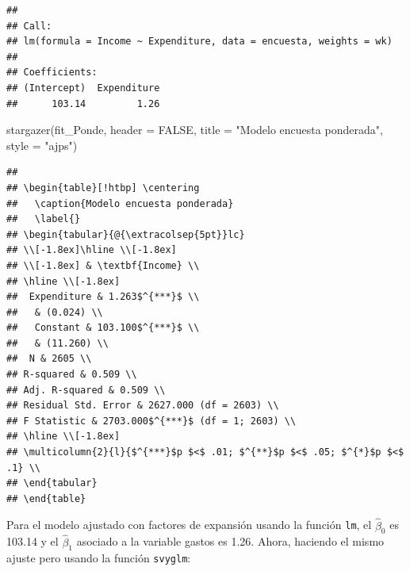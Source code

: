 \documentclass[
  12pt,
]{book}
\newenvironment{Shaded}{\begin{snugshade}}{\end{snugshade}}
\newcommand{\AttributeTok}[1]{\textcolor[rgb]{0.77,0.63,0.00}{#1}}
\newcommand{\ConstantTok}[1]{\textcolor[rgb]{0.00,0.00,0.00}{#1}}
\newcommand{\FunctionTok}[1]{\textcolor[rgb]{0.00,0.00,0.00}{#1}}
\newcommand{\NormalTok}[1]{#1}
\newcommand{\StringTok}[1]{\textcolor[rgb]{0.31,0.60,0.02}{#1}}
\begin{document}
\begin{verbatim}
## 
## Call:
## lm(formula = Income ~ Expenditure, data = encuesta, weights = wk)
## 
## Coefficients:
## (Intercept)  Expenditure  
##      103.14         1.26
\end{verbatim}

\begin{Shaded}
\begin{Highlighting}[]
\FunctionTok{stargazer}\NormalTok{(fit\_Ponde, }\AttributeTok{header =} \ConstantTok{FALSE}\NormalTok{,}
          \AttributeTok{title =} \StringTok{"Modelo encuesta ponderada"}\NormalTok{, }
          \AttributeTok{style =} \StringTok{"ajps"}\NormalTok{)}
\end{Highlighting}
\end{Shaded}

\begin{verbatim}
## 
## \begin{table}[!htbp] \centering 
##   \caption{Modelo encuesta ponderada} 
##   \label{} 
## \begin{tabular}{@{\extracolsep{5pt}}lc} 
## \\[-1.8ex]\hline \\[-1.8ex] 
## \\[-1.8ex] & \textbf{Income} \\ 
## \hline \\[-1.8ex] 
##  Expenditure & 1.263$^{***}$ \\ 
##   & (0.024) \\ 
##   Constant & 103.100$^{***}$ \\ 
##   & (11.260) \\ 
##  N & 2605 \\ 
## R-squared & 0.509 \\ 
## Adj. R-squared & 0.509 \\ 
## Residual Std. Error & 2627.000 (df = 2603) \\ 
## F Statistic & 2703.000$^{***}$ (df = 1; 2603) \\ 
## \hline \\[-1.8ex] 
## \multicolumn{2}{l}{$^{***}$p $<$ .01; $^{**}$p $<$ .05; $^{*}$p $<$ .1} \\ 
## \end{tabular} 
## \end{table}
\end{verbatim}

Para el modelo ajustado con factores de expansión usando la función \texttt{lm}, el \(\hat{\beta}_{0}\) es 103.14 y el \(\hat{\beta}_{1}\) asociado a la variable gastos es 1.26. Ahora, haciendo el mismo ajuste pero usando la función \texttt{svyglm}:
\end{document}
